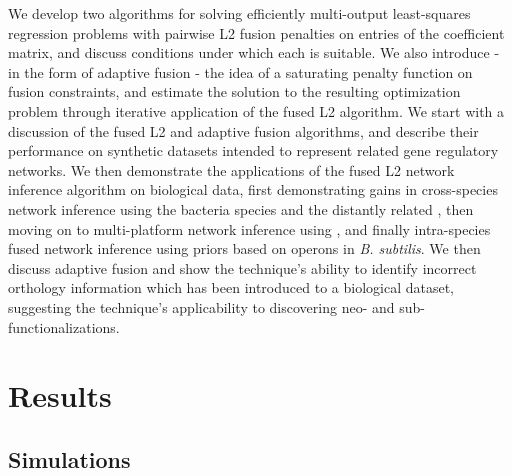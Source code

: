 \documentclass[11pt]{article}
\begin{document}

We develop two algorithms for solving efficiently multi-output least-squares regression problems with pairwise L2 fusion penalties on entries of the coefficient matrix, and discuss conditions under which each is suitable. We also introduce - in the form of adaptive fusion - the idea of a saturating penalty function on fusion constraints, and estimate the solution to the resulting optimization problem through iterative application of the fused L2 algorithm. We start with a discussion of the fused L2 and adaptive fusion algorithms, and describe their performance on synthetic datasets intended to represent related gene regulatory networks. We then demonstrate the applications of the fused L2 network inference algorithm on biological data, first demonstrating gains in cross-species network inference using the bacteria species  and the distantly related , then moving on to multi-platform network inference using , and finally intra-species fused network inference using priors based on operons in \textit{B. subtilis}. We then discuss adaptive fusion and show the technique's ability to identify incorrect orthology information which has been introduced to a biological dataset, suggesting the technique's applicability to discovering neo- and sub-functionalizations. 


\section{Results}

\subsection{Simulations}
\end{document}
